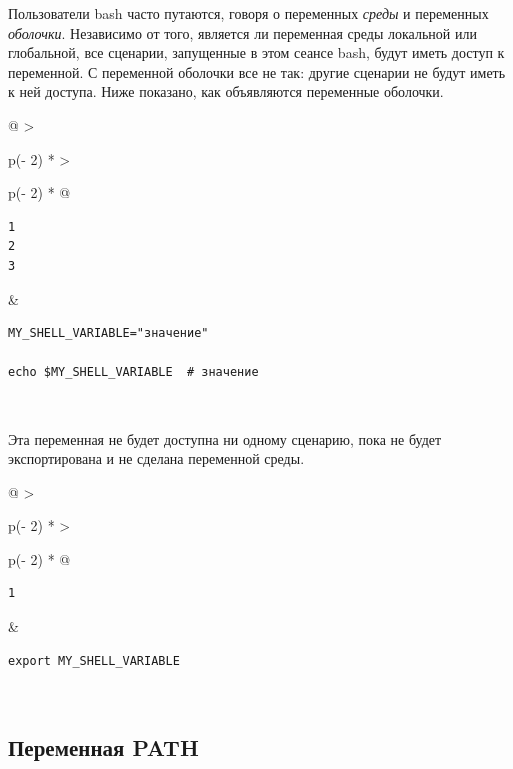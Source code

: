 \documentclass{article}
\begin{document}
Пользователи bash часто путаются, говоря о переменных \emph{среды} и
переменных \emph{оболочки}. Независимо от того, является ли переменная
среды локальной или глобальной, все сценарии, запущенные в этом сеансе
bash, будут иметь доступ к переменной. С переменной оболочки все не так:
другие сценарии не будут иметь к ней доступа. Ниже показано, как
объявляются переменные оболочки.

\begin{longtable}[]{@{}
  >{\raggedright\arraybackslash}p{(\columnwidth - 2\tabcolsep) * }
  >{\raggedright\arraybackslash}p{(\columnwidth - 2\tabcolsep) * }@{}}
\toprule
\endhead
\begin{minipage}[t]{\linewidth}\raggedright
\begin{verbatim}
1
2
3
\end{verbatim}
\end{minipage} & \begin{minipage}[t]{\linewidth}\raggedright
\begin{verbatim}
MY_SHELL_VARIABLE="значение"

echo $MY_SHELL_VARIABLE  # значение
\end{verbatim}
\end{minipage} \\ \addlinespace
\bottomrule
\end{longtable}

Эта переменная не будет доступна ни одному сценарию, пока не будет
экспортирована и не сделана переменной среды.

\begin{longtable}[]{@{}
  >{\raggedright\arraybackslash}p{(\columnwidth - 2\tabcolsep) * }
  >{\raggedright\arraybackslash}p{(\columnwidth - 2\tabcolsep) * }@{}}
\toprule
\endhead
\begin{minipage}[t]{\linewidth}\raggedright
\begin{verbatim}
1
\end{verbatim}
\end{minipage} & \begin{minipage}[t]{\linewidth}\raggedright
\begin{verbatim}
export MY_SHELL_VARIABLE
\end{verbatim}
\end{minipage} \\ \addlinespace
\bottomrule
\end{longtable}

\hypertarget{PATH-variable}{%
\subsection{\texorpdfstring{\protect\hyperlink{PATH-variable}{}Переменная
PATH}{Переменная PATH}}\label{PATH-variable}}
\end{document}
